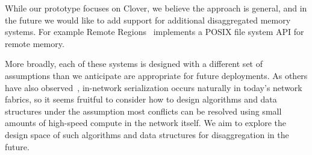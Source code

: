 %
While our prototype focuses on Clover, we believe the
approach is general, and in the future we would like to add support
for additional disaggregated memory systems. For example Remote
Regions~\cite{reigons} implements a POSIX file system API for remote
memory.

More broadly, each of these systems is designed with a different set
of assumptions than we anticipate are appropriate for future
deployments.  As others have also observed~\cite{mom}, in-network
serialization occurs naturally in today's network fabrics, so it seems
fruitful to consider how to design algorithms and data structures
under the assumption most conflicts can be resolved using small
amounts of high-speed compute in the network itself. We aim to explore
the design space of such algorithms and data structures for
disaggregation in the future.

